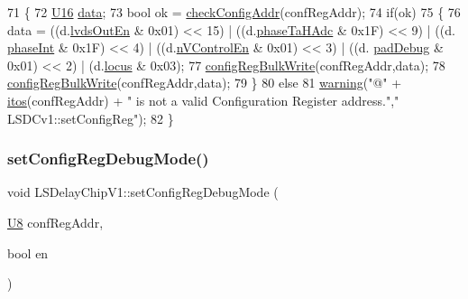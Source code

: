 \begin{DoxyCode}
71 \{
72     \hyperlink{ICECALv3_8h_adf928e51a60dba0df29d615401cc55a8}{U16} \hyperlink{namespaceshell_a5ea2525995cedc3efd69ea8a7f034d1e}{data};
73     \textcolor{keywordtype}{bool} ok = \hyperlink{classLSDelayChipV1_aa8118972150a9e1e95e9006e003c0206}{checkConfigAddr}(confRegAddr);
74     \textcolor{keywordflow}{if}(ok)
75     \{
76         data = ((d.\hyperlink{structconfRegData_a709d8d691ef0c8ea5c4c03aac3d851f1}{lvdsOutEn} & 0x01) << 15) | ((d.\hyperlink{structconfRegData_a2e471f30b32e57270cb2edb0e420cf1b}{phaseTaHAdc} & 0x1F) << 9) | ((d.
      \hyperlink{structconfRegData_aee4fd08aceaaf19fcb8edfe8aa50f5ab}{phaseInt} & 0x1F) << 4) | ((d.\hyperlink{structconfRegData_a62f72429bde3ede255f6d8dfe1401c37}{nVControlEn} & 0x01) << 3) | ((d.
      \hyperlink{structconfRegData_a4e98d082c44e34995224bd242da493d0}{padDebug} & 0x01) << 2) | (d.\hyperlink{structconfRegData_a0ed9976dd55237ee70ba3621b0f4f58c}{locus} & 0x03);
77         \hyperlink{classLSDelayChipV1_afa626b5d52f8723bcaa3205d1cc7a0f8}{configRegBulkWrite}(confRegAddr,data);
78 \hyperlink{classLSDelayChipV1_afa626b5d52f8723bcaa3205d1cc7a0f8}{configRegBulkWrite}(confRegAddr,data); 
79     \}
80     \textcolor{keywordflow}{else}
81          \hyperlink{classObject_a65cd4fda577711660821fd2cd5a3b4c9}{warning}(\textcolor{stringliteral}{"@"} + \hyperlink{Tools_8h_af330027dbdafb9a30768b3613c553e60}{itos}(confRegAddr) + \textcolor{stringliteral}{" is not a valid Configuration Register address."},\textcolor{stringliteral}{"
      LSDCv1::setConfigReg"});    
82 \}
\end{DoxyCode}
\mbox{\label{classLSDelayChipV1_a813eca3585445d504d60a93ec55817f4}} 
\subsubsection{\texorpdfstring{set\+Config\+Reg\+Debug\+Mode()}{setConfigRegDebugMode()}}
{\footnotesize\ttfamily void L\+S\+Delay\+Chip\+V1\+::set\+Config\+Reg\+Debug\+Mode (\begin{DoxyParamCaption}\item[{\hyperlink{ICECALv3_8h_a3cb25ca6f51f003950f9625ff05536fc}{U8}}]{conf\+Reg\+Addr,  }\item[{bool}]{en }\end{DoxyParamCaption})}



